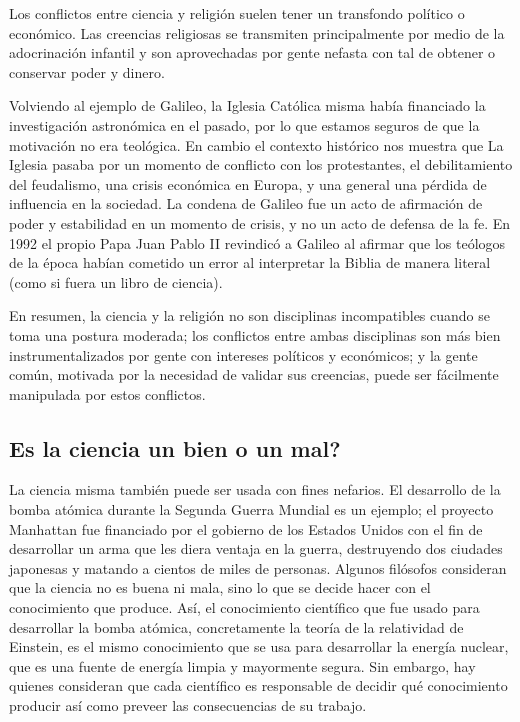 \begin{remember}
    \label{rem:religion}
    Los conflictos entre ciencia y religión suelen tener un transfondo político
    o económico.
    Las creencias religiosas se transmiten principalmente por medio de la
    adocrinación infantil y son aprovechadas por gente nefasta con tal de
    obtener o conservar poder y dinero.
\end{remember}

Volviendo al ejemplo de Galileo, la Iglesia Católica misma había financiado la
investigación astronómica en el pasado, por lo que estamos seguros de que la
motivación no era teológica.
En cambio el contexto histórico nos muestra que La Iglesia pasaba por un momento
de conflicto con los protestantes, el debilitamiento del feudalismo, una crisis
económica en Europa, y una general una pérdida de influencia en la sociedad.
La condena de Galileo fue un acto de afirmación de poder y estabilidad en un
momento de crisis, y no un acto de defensa de la fe.
En 1992 el propio Papa Juan Pablo II revindicó a Galileo al afirmar que los
teólogos de la época habían cometido un error al interpretar la Biblia de manera
literal (como si fuera un libro de ciencia).

En resumen, la ciencia y la religión no son disciplinas incompatibles cuando se
toma una postura moderada; los conflictos entre ambas disciplinas son más bien
instrumentalizados por gente con intereses políticos y económicos; y la gente
común, motivada por la necesidad de validar sus creencias, puede ser fácilmente
manipulada por estos conflictos.

\subsection*{Es la ciencia un bien o un mal?}
\label{sub:eslacienciaunbienounmal}

La ciencia misma también puede ser usada con fines nefarios.
El desarrollo de la bomba atómica durante la Segunda Guerra Mundial es un
ejemplo; el proyecto Manhattan fue financiado por el gobierno de los Estados
Unidos con el fin de desarrollar un arma que les diera ventaja en la guerra,
destruyendo dos ciudades japonesas y matando a cientos de miles de personas.
Algunos filósofos consideran que la ciencia no es buena ni mala, sino lo que
se decide hacer con el conocimiento que produce.
Así, el conocimiento científico que fue usado para desarrollar la bomba atómica,
concretamente la teoría de la relatividad de Einstein, es el mismo conocimiento
que se usa para desarrollar la energía nuclear, que es una fuente de energía
limpia y mayormente segura.
Sin embargo, hay quienes consideran que cada científico es responsable de
decidir qué conocimiento producir así como preveer las consecuencias de su
trabajo.

